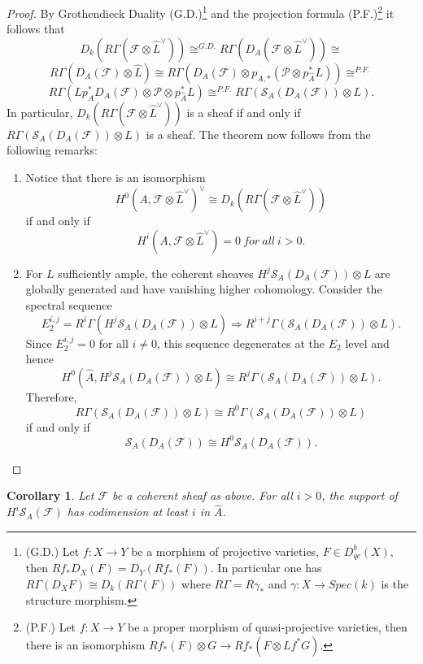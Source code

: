 \documentclass[10pt]{amsart}
\newtheorem{cor}[thm]{Corollary}
\newcommand\lra{\longrightarrow}
\newcommand\ot{{\otimes}}
\newcommand\LL{{\mathcal{P}}}
\newcommand\FF{{\mathcal{F}}}
\newcommand\s{{ {\mathcal S}}}
\begin{document}
 \begin{proof}
 By Grothendieck Duality (G.D.)\footnote{(G.D.) 
Let $f:X\lra Y$ be a morphism of 
projective varieties, $F\in D^b_{qc}(X)$, then $Rf_*D_X(F)=D_Y(Rf_*(F))$.
In particular one has $R\Gamma (D_XF)\cong D_k(R\Gamma (F))$ where $R\Gamma 
=R\gamma _*$ and $\gamma : X \lra Spec (k)$ is the structure morphism.}
and the projection formula 
(P.F.)\footnote{(P.F.) Let $f:X\lra Y$ be a proper morphism of 
quasi-projective varieties, then there is an isomorphism
$Rf_*(F)\ot G\lra Rf_*(F\ot Lf^*G)$.} it follows that
$$ D_k (R \Gamma (\FF \ot 
 \hat {L}^\vee ))\cong^{G.D.}R \Gamma (D_A(\FF \ot \hat{L}^\vee ))\cong$$ 
 $$R \Gamma (D_A(\FF )\ot \hat{L})\cong 
R \Gamma (D_A(\FF )\ot p_{A,*}(\LL \ot p_{\hat{A}}^*L))\cong ^{P.F.}$$
 $$R \Gamma (L p_A^* D_A (\FF) \ot \LL \ot p_{\hat{A}}^*L)\cong^{P.F.}
R \Gamma (\s _A (D_A(\FF ))\ot L).$$
In particular, $D_k (R \Gamma (\FF \ot 
 \hat {L}^\vee ))$ is a sheaf if and only if $R \Gamma (\s _A
 (D_A (\FF)) \ot L)$ is a sheaf.
The theorem now follows from the following remarks:
\begin{enumerate} 
\item Notice that there is an isomorphism
$$H^0(A,\FF \ot \hat {L}^\vee )^\vee \cong D_k (R \Gamma (\FF \ot 
 \hat {L}^\vee ))$$ 
if and only if $$H^i(A,\FF \ot \hat {L}^\vee )=0\ for\ all\ i>0.$$
 
\item For $L$ sufficiently ample, the coherent sheaves
 $H^j\s _A (D_A (\FF))\ot L$ are globally generated and 
have vanishing higher cohomology. 
Consider the spectral sequence
 $$E_2^{i,j}=R^i\Gamma (H^j\s _A (D_A (\FF ))\ot L)\Rightarrow R^{i+j}\Gamma (
 \s _A (D_A(\FF )) \ot L).$$
 Since $E_2^{i,j}=0$ for all $i\ne 0$, this sequence degenerates at the $E_2$
 level and hence $$H^0(\hat{A}, H^j\s _A (D_A(\FF ))\ot L)\cong 
 R^j\Gamma (\s _A ( D_A(\FF ))\ot L ).$$
Therefore, 
$$R \Gamma (\s _A ( D_A (\FF))\ot L)\cong
R^0 \Gamma ( \s _A (D_A (\FF)) \ot L)$$
if and only if 
$$ \s _A (D_A(\FF ))\cong H^0\s _A (D_A(\FF )).$$
\end{enumerate}
 \end{proof}
\begin{cor} \label{C} Let $\FF$ be a coherent sheaf as above. For all $i>0$, 
the support of $H^i\s _A (\FF )$ 
has codimension at least $i$ in $\hat {A}$.
\end{cor}
\end{document}
